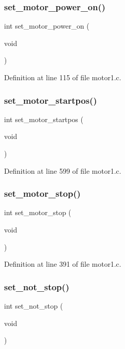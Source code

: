\subsubsection{set\+\_\+motor\+\_\+power\+\_\+on()}
{\footnotesize\ttfamily int set\+\_\+motor\+\_\+power\+\_\+on (\begin{DoxyParamCaption}\item[{void}]{ }\end{DoxyParamCaption})}



Definition at line 115 of file motor1.\+c.

\mbox{\label{motor1_8c_a01a9f2f0272b5b4f53e9b5d8487328a5}} 
\subsubsection{set\+\_\+motor\+\_\+startpos()}
{\footnotesize\ttfamily int set\+\_\+motor\+\_\+startpos (\begin{DoxyParamCaption}\item[{void}]{ }\end{DoxyParamCaption})}



Definition at line 599 of file motor1.\+c.

\mbox{\label{motor1_8c_afd8be57a5ca0755c4b210876e2dcc671}} 
\subsubsection{set\+\_\+motor\+\_\+stop()}
{\footnotesize\ttfamily int set\+\_\+motor\+\_\+stop (\begin{DoxyParamCaption}\item[{void}]{ }\end{DoxyParamCaption})}



Definition at line 391 of file motor1.\+c.

\mbox{\label{motor1_8c_a1f1537adeeb42279cc3045e28ee51b21}} 
\subsubsection{set\+\_\+not\+\_\+stop()}
{\footnotesize\ttfamily int set\+\_\+not\+\_\+stop (\begin{DoxyParamCaption}\item[{void}]{ }\end{DoxyParamCaption})}




